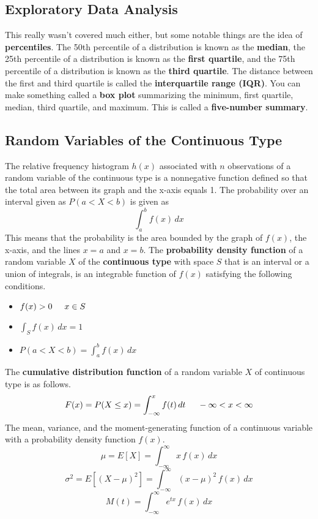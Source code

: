 \documentclass{article}
\begin{document}
\subsection{Exploratory Data Analysis}
This really wasn't covered much either, but some notable things are the idea of \textbf{percentiles}. The 50th percentile of a distribution is known as the \textbf{median}, the 25th percentile of a distribution is known as the \textbf{first quartile}, and the 75th percentile of a distribution is known as the \textbf{third quartile}. The distance between the first and third quartile is called the \textbf{interquartile range (IQR)}. You can make something called a \textbf{box plot} summarizing the minimum, first quartile, median, third quartile, and maximum. This is called a \textbf{five-number summary}.
\subsection{Random Variables of the Continuous Type}
The relative frequency histogram \(h(x)\) associated with \(n\) observations of a random variable of the continuous type is a nonnegative function defined so that the total area between its graph and the x-axis equals 1. The probability over an interval given as \(P(a<X<b)\) is given as
\[\int_a^bf(x)\,dx\]
This means that the probability is the area bounded by the graph of \(f(x)\), the x-axis, and the lines \(x=a\) and \(x=b\). The \textbf{probability density function} of a random variable \(X\) of the \textbf{continuous type} with space \(S\) that is an interval or a union of integrals, is an integrable function of \(f(x)\) satisfying the following conditions.
\begin{itemize}
    \item \(f(x)>0\hspace{5 mm}x\in S\)
    \item \(\int_Sf(x)\,dx=1\)
    \item \(P(a<X<b)=\int_a^bf(x)\,dx\)
\end{itemize}
The \textbf{cumulative distribution function} of a random variable \(X\) of continuous type is as follows.
\[F(x)=P(X\leq x)=\int_{-\infty}^xf(t)\,dt\hspace{5 mm}-\infty <x<\infty\]
The mean, variance, and the moment-generating function of a continuous variable with a probability density function \(f(x)\).
\[\mu=E[X]=\int_{-\infty}^{\infty}x\,f(x)\,dx\]
\[\sigma^2=E[(X-\mu)^2]=\int_{-\infty}^{\infty}(x-\mu)^2\,f(x)\,dx\]
\[M(t)=\int_{-\infty}^{\infty}e^{tx}\,f(x)\,dx\]
\end{document}
